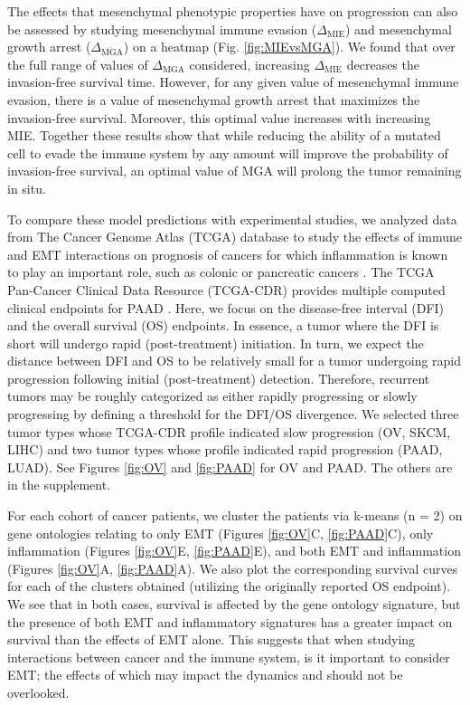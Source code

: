 \documentclass[11pt]{article}
\begin{document}
The effects that mesenchymal phenotypic properties have on progression can also be assessed by studying mesenchymal immune evasion ($\Delta_\text{MIE}$) and mesenchymal growth arrest ($\Delta_\text{MGA}$) on a heatmap (Fig. \ref{fig:MIEvsMGA}). We found that over the full range of values of $\Delta_\text{MGA}$ considered, increasing $\Delta_\text{MIE}$ decreases the invasion-free survival time. However, for any given value of mesenchymal immune evasion, there is a value of mesenchymal growth arrest that maximizes the invasion-free survival. Moreover, this optimal value increases with increasing MIE. Together these results show that while reducing the ability of a mutated cell to evade the immune system by any amount will improve the probability of invasion-free survival, an optimal value of MGA will prolong the tumor remaining in situ. 
\par
To compare these model predictions with experimental studies, we analyzed data from The Cancer Genome Atlas (TCGA) database to study the effects of immune and EMT interactions on prognosis of cancers for which inflammation is known to play an important role, such as colonic or pancreatic cancers \cite{greten2019inflammation,hu2010inflammation}.
The TCGA Pan-Cancer Clinical Data Resource (TCGA-CDR) provides multiple computed clinical endpoints for PAAD \cite{liu2018integrated}.
Here, we focus on the disease-free interval (DFI) and the overall survival (OS) endpoints.
In essence, a tumor where the DFI is short will undergo rapid (post-treatment) initiation.
In turn, we expect the distance between DFI and OS to be relatively small for a tumor undergoing rapid progression following initial (post-treatment) detection.
Therefore, recurrent tumors may be roughly categorized as either rapidly progressing or slowly progressing by defining a threshold for the DFI/OS divergence.
We selected three tumor types whose TCGA-CDR profile indicated slow progression (OV, SKCM, LIHC) and two tumor types whose profile indicated rapid progression (PAAD, LUAD).
See Figures \ref{fig:OV} and \ref{fig:PAAD} for OV and PAAD. The others are in the supplement.
\par
For each cohort of cancer patients, we cluster the patients via k-means (n = 2) on gene ontologies relating to only EMT (Figures \ref{fig:OV}C, \ref{fig:PAAD}C), only inflammation (Figures \ref{fig:OV}E, \ref{fig:PAAD}E), and both EMT and inflammation (Figures \ref{fig:OV}A, \ref{fig:PAAD}A).
We also plot the corresponding survival curves for each of the clusters obtained (utilizing the originally reported OS endpoint).
We see that in both cases, survival is affected by the gene ontology signature, but the presence of both EMT and inflammatory signatures has a greater impact on survival than the effects of EMT alone.
This suggests that when studying interactions between cancer and the immune system, is it important to consider EMT; the effects of which may impact the dynamics and should not be overlooked. 
\end{document}

